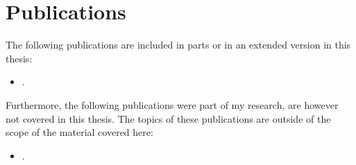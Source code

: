 \chapter*{Publications}

The following publications are included in parts or in an extended version in this thesis:
\begin{itemize}
    \item {}.
\end{itemize}

Furthermore, the following publications were part of my research, are however not covered in this thesis.
The topics of these publications are outside of the scope of the material covered here:
\begin{itemize}
    \item {}.
\end{itemize}

